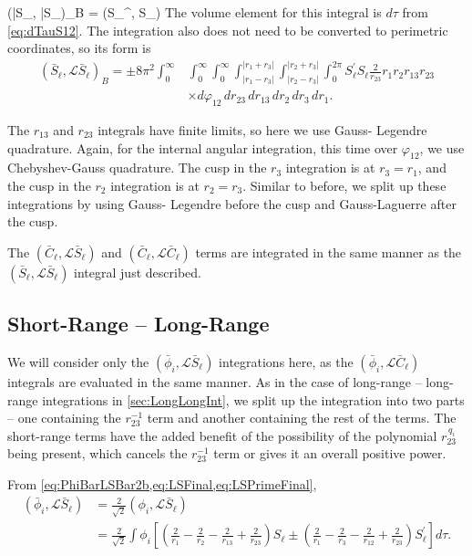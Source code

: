 \documentclass[Dissertation.tex]{subfiles}
\begin{document}
\beq
(\bar{S}_\ell, \bar{S}_\ell)_B = \pm \left(S_\ell^\prime,  S_\ell\right)
\eeq
The volume element for this integral is $d\tau$ from \cref{eq:dTauS12}.
The integration also does not need to be converted to perimetric coordinates,
so its form is
\begin{align}
(\bar{S}_\ell,\mathcal{L} \bar{S}_\ell)_B = \pm 8\pi^2 \int_0^\infty & \int_0^\infty \int_0^\infty \int_{|r_1 - r_3|}^{|r_1 + r_3|} \int_{|r_2 - r_3|}^{|r_2 + r_3|} \int_0^{2\pi}  S_\ell^\prime S_\ell \frac{2}{r_{23}} r_1 r_2 r_{13} r_{23} \nonumber \\
& \times d\varphi_{12}\, dr_{23}\, dr_{13}\, dr_2\, dr_3\, dr_1.
\end{align}

The $r_{13}$ and $r_{23}$ integrals have finite limits, so here we use Gauss-
Legendre quadrature. Again, for the internal angular integration, this time 
over $\varphi_{12}$, we use Chebyshev-Gauss quadrature. The cusp in the $r_3$ 
integration is at $r_3 = r_1$, and the cusp in the $r_2$ integration is at
$r_2 = r_3$. Similar to before, we split up these integrations by using Gauss-
Legendre before the cusp and Gauss-Laguerre after the cusp.

The $(\bar{C}_\ell,\mathcal{L} \bar{S}_\ell)$ and
$(\bar{C}_\ell,\mathcal{L} \bar{C}_\ell)$ terms
are integrated in the same manner as the
$(\bar{S}_\ell,\mathcal{L} \bar{S}_\ell)$ integral just described.


\subsection{Short-Range -- Long-Range}
\label{sec:ShortLongInt}
We will consider only the $(\bar{\phi}_i,\mathcal{L} \bar{S}_\ell)$ 
integrations here, as the $(\bar{\phi}_i,\mathcal{L} \bar{C}_\ell)$ integrals 
are evaluated in the same manner. As in the case of long-range -- long-range 
integrations in \cref{sec:LongLongInt}, we split up the integration 
into two parts -- one containing the $r_{23}^{-1}$ term and another 
containing the rest of the terms. The short-range terms have the added 
benefit of the possibility of the polynomial $r_{23}^{\,q_i}$ being present, 
which cancels the $r_{23}^{-1}$ term or gives it an overall positive power.


From \cref{eq:PhiBarLSBar2b,eq:LSFinal,eq:LSPrimeFinal},
\begin{align}
\label{eq:PhiLSBarInt}
\nonumber (\bar{\phi}_i, \mathcal{L} \bar{S}_\ell) &= \frac{2}{\sqrt{2}} \left(\phi_i,\mathcal{L} \bar{S}_\ell\right) \\
 &= \frac{2}{\sqrt{2}} \int \phi_i \left[ \left( \frac{2}{r_1} - \frac{2}{r_2} - \frac{2}{r_{13}} + \frac{2}{r_{23}} \right)S_\ell \pm \left( \frac{2}{r_1} - \frac{2}{r_3} - \frac{2}{r_{12}} + \frac{2}{r_{23}} \right) S_\ell^\prime \right]  d\tau.
\end{align}
\end{document}
